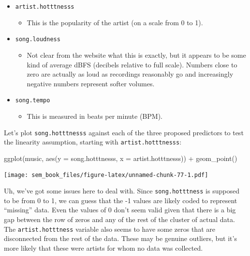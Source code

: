 \documentclass[
]{book}
\newenvironment{Shaded}{\begin{snugshade}}{\end{snugshade}}
\newcommand{\AttributeTok}[1]{\textcolor[rgb]{0.77,0.63,0.00}{#1}}
\newcommand{\FunctionTok}[1]{\textcolor[rgb]{0.00,0.00,0.00}{#1}}
\newcommand{\NormalTok}[1]{#1}
\newcommand{\SpecialCharTok}[1]{\textcolor[rgb]{0.00,0.00,0.00}{#1}}
\providecommand{\tightlist}{%
  \setlength{\itemsep}{0pt}\setlength{\parskip}{0pt}}
\begin{document}
\begin{itemize}
\tightlist
\item
  \texttt{artist.hotttnesss}

  \begin{itemize}
  \tightlist
  \item
    This is the popularity of the artist (on a scale from 0 to 1).
  \end{itemize}
\item
  \texttt{song.loudness}

  \begin{itemize}
  \tightlist
  \item
    Not clear from the website what this is exactly, but it appears to be some kind of average dBFS (decibels relative to full scale). Numbers close to zero are actually as loud as recordings reasonably go and increasingly negative numbers represent softer volumes.
  \end{itemize}
\item
  \texttt{song.tempo}

  \begin{itemize}
  \tightlist
  \item
    This is measured in beats per minute (BPM).
  \end{itemize}
\end{itemize}

Let's plot \texttt{song.hotttnesss} against each of the three proposed predictors to test the linearity assumption, starting with \texttt{artist.hotttnesss}:

\begin{Shaded}
\begin{Highlighting}[]
\FunctionTok{ggplot}\NormalTok{(music, }\FunctionTok{aes}\NormalTok{(}\AttributeTok{y =}\NormalTok{ song.hotttnesss,}
                  \AttributeTok{x =}\NormalTok{ artist.hotttnesss)) }\SpecialCharTok{+}
    \FunctionTok{geom\_point}\NormalTok{()}
\end{Highlighting}
\end{Shaded}

\texttt{[image: sem\_book\_files/figure-latex/unnamed-chunk-77-1.pdf]}

Uh, we've got some issues here to deal with. Since \texttt{song.hotttness} is supposed to be from 0 to 1, we can guess that the -1 values are likely coded to represent ``missing'' data. Even the values of 0 don't seem valid given that there is a big gap between the row of zeros and any of the rest of the cluster of actual data. The \texttt{artist.hotttness} variable also seems to have some zeros that are disconnected from the rest of the data. These may be genuine outliers, but it's more likely that these were artists for whom no data was collected.
\end{document}
